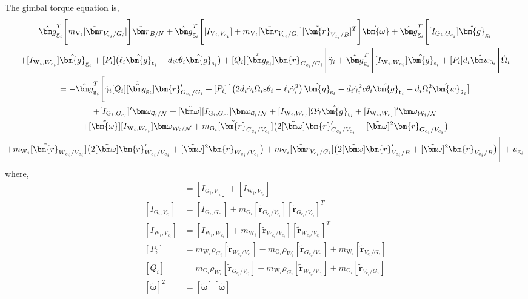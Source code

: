 The gimbal torque equation is,
\begin{multline}
\hat{\bm g}_{\text{g}_i}^T \Bigg[ m_{\text{V}_i}[\tilde{\bm r}_{V_{c_i}/G_i}] \Bigg] \ddot{\bm r}_{B/N}
+ \hat{\bm g}_{\text{g}_i}^T \Bigg[ [I_{\text{V}_i,V_{c_i}}] + m_{\text{V}_i}[\tilde{\bm r}_{V_{c_i}/G_i}][\tilde{\bm{r}}_{V_{c_i}/B}]^T \Bigg] \dot{\bm{\omega}}
+ \hat{\bm g}_{\text{g}_i}^T \Bigg[ [I_{\text{G}_i,G_{c_i}}]\hat{\bm{g}}_{\text{g}_i} \\+ [I_{\text{W}_i,W_{c_i}}]\hat{\bm{g}}_{\text{g}_i} + [P_i] \big(\ell_i\hat{\bm{g}}_{\text{t}_i} - d_ic\theta_i\hat{\bm{g}}_{\text{s}_i}\big) + [Q_i] [\tilde{\hat{\bm g}}_{\text{g}_i}]\bm{r}_{G_{c_i}/G_i} \Bigg] \ddot{\gamma}_i
+ \hat{\bm g}_{\text{g}_i}^T \Bigg[ [I_{\text{W}_i,W_{c_i}}]\hat{\bm{g}}_{\text{s}_i} + [P_i] d_i\hat{\bm w}_{3_i} \Bigg] \dot{\Omega}_i
\\ = - \hat{\bm g}_{\text{g}_i}^T \Bigg[ \dot{\gamma}_i[Q_i][\tilde{\hat{\bm g}}_{\text{g}_i}]\bm{r}'_{G_{c_i}/G_i} + [P_i] \big[\left(2d_i\dot{\gamma}_i\Omega_i\text{s}\theta_i - \ell_i\dot{\gamma}_i^2\right)\hat{\bm{g}}_{\text{s}_i} - d_i\dot{\gamma}_i^2c\theta_i\hat{\bm{g}}_{\text{t}_i} - d_i\Omega_i^2 \hat{\bm{w}}_{2_i}\big]
\\+[I_{\text{G}_i,G_{c_i}}]'\bm\omega_{\mathcal{G}_i/\cal N} + [\tilde{\bm\omega}][I_{\text{G}_i,G_{c_i}}]\bm\omega_{\mathcal{G}_i/\cal N} + [I_{\text{W}_i,W_{c_i}}]\Omega\dot{\gamma}\hat{\bm{g}}_{\text{t}_i} + [I_{\text{W}_i,W_{c_i}}]'\bm\omega_{\mathcal{W}_i/\cal N} \\+ [\tilde{\bm{\omega}}][I_{\text{W}_i,W_{c_i}}]\bm\omega_{\mathcal{W}_i/\cal N}
+ m_{\text{G}_i}[\tilde{\bm{r}}_{G_{c_i}/V_{c_i}}] \big( 2[\tilde{\bm\omega}]\bm{r}'_{G_{c_i}/V_{c_i}} + [\tilde{\bm\omega}]^2\bm{r}_{G_{c_i}/V_{c_i}}\big)
\\ + m_{\text{W}_i}[\tilde{\bm{r}}_{W_{c_i}/V_{c_i}}]\big( 2[\tilde{\bm\omega}]\bm{r}'_{W_{c_i}/V_{c_i}} + [\tilde{\bm\omega}]^2\bm{r}_{W_{c_i}/V_{c_i}}\big)
+ m_{\text{V}_i}[\tilde{\bm r}_{V_{c_i}/G_i}]\big( 2[\tilde{\bm\omega}]\bm{r}'_{V_{c_i}/B} + [\tilde{\bm\omega}]^2\bm{r}_{V_{c_i}/B} \big) \Bigg] + u_{\text{g}_i}
\label{eq:vscmgtorqueMod}
\end{multline}
where,
\begin{align}
[I_{\text{V}_i,V_{c_i}}] &= [I_{\text{G}_i,V_{c_i}}] + [I_{\text{W}_i,V_{c_i}}]
\\
[I_{\text{G}_i,V_{c_i}}] &= [I_{\text{G}_i,G_{c_i}}] + m_{\text{G}_i}[\tilde{\bm{r}}_{G_{c_i}/V_{c_i}}][\tilde{\bm{r}}_{G_{c_i}/V_{c_i}}]^T
\\
[I_{\text{W}_i,V_{c_i}}] &= [I_{\text{W}_i,W_{c_i}}] + m_{\text{W}_i}[\tilde{\bm{r}}_{W_{c_i}/V_{c_i}}][\tilde{\bm{r}}_{W_{c_i}/V_{c_i}}]^T
\\
[P_i] &= m_{\text{W}_i}\rho_{G_i}[\tilde{\bm{r}}_{W_{c_i}/V_{c_i}}] - m_{\text{G}_i}\rho_{W_i}[\tilde{\bm{r}}_{G_{c_i}/V_{c_i}}] + m_{\text{W}_i}[\tilde{\bm r}_{V_{c_i}/G_i}]
\\
[Q_i] &= m_{\text{G}_i}\rho_{W_i}[\tilde{\bm{r}}_{G_{c_i}/V_{c_i}}] - m_{\text{W}_i}\rho_{G_i}[\tilde{\bm{r}}_{W_{c_i}/V_{c_i}}] + m_{\text{G}_i}[\tilde{\bm r}_{V_{c_i}/G_i}]
\\
[\tilde{\bm\omega}]^2 &= [\tilde{\bm\omega}][\tilde{\bm\omega}]
\end{align}

